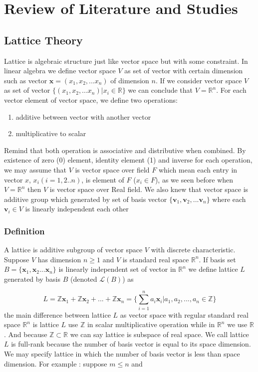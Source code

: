 \chapter{Review of Literature and Studies}
\section{Lattice Theory}
Lattice is algebraic structure just like vector space but with some constraint. In linear algebra we define vector space $ V $ as set of vector with certain dimension such as vector $ \mathbf{x} = (x_1, x_2, ... x_n) $ of dimension $ n $. If we consider vector space $ V $ as set of vector  $\{ ( x_1, x_2, ... x_n ) | x_i \in \mathbb{R} \}$ we can conclude that $ V = \mathbb{R}^n $. For each vector element of vector space, we define two operations: 
\begin{enumerate}
\item additive between vector with another vector
\item multiplicative to scalar
\end{enumerate}
Remind that both operation is associative and distributive when combined. By existence of zero (0) element, identity element (1) and inverse for each operation, we may assume that $V$ is vector space over field $F$ which mean each entry in vector $ x $, $x_i (i=1,2..n)$, is element of $F$ ($x_i \in F$), as we seen before when $ V=\mathbb{R}^n $ then $V$ is vector space over Real field. We also knew that vector space is additive group which generated by set of basis vector $ \{ \mathbf{v}_1, \mathbf{v}_2, ... \mathbf{v}_n \} $ where each $ \mathbf{v}_i \in V $ is linearly independent each other
\subsection{Definition}
A lattice is additive subgroup of vector space $ V $ with discrete characteristic. Suppose $ V $ has dimension  $ n \geq 1 $ and $ V $ is standard real space $\mathbb{R}^n$. If basis set $ B = \{ \mathbf{x}_1, \mathbf{x}_2 ... \mathbf{x}_n \} $ is linearly independent set of vector in $ \mathbb{R}^n $ we define lattice $ L $ generated by basis $B$ (denoted $\mathcal{L}(B)$) as

\[ L = \mathbb{Z}\mathbf{x}_1 + \mathbb{Z}\mathbf{x}_2 +...+ \mathbb{Z}\mathbf{x}_n = \Big \{ \sum_{i=1}^{n} a_{i}\mathbf{x}_{i} | a_{1}, a_{2},...,a_{n} \in \mathbb{Z} \Big \} \]
the main difference between lattice $L$ as vector space with regular standard real space $\mathbb{R}^n$ is lattice $L$ use $\mathbb{Z}$ in scalar multiplicative operation while in $\mathbb{R}^n$ we use $\mathbb{R}$. And because $ \mathbb{Z} \subset \mathbb{R} $ we can say lattice is subspace of real space. We call lattice $L$ is full-rank because the number of basis vector is equal to its space dimension. We may specify lattice in which the number of basis vector is less than space dimension. For example : suppose $ m \leq n $ and 

